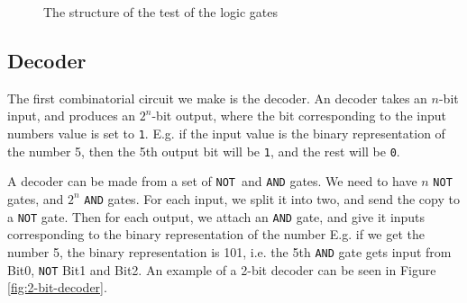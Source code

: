 \begin{figure}
    \centering
    \caption{The structure of the test of the logic gates}
    \label{fig:logic-test}
\end{figure}

\subsection{Decoder}
The first combinatorial circuit we make is the decoder. An decoder takes an
$n$-bit input, and produces an $2^n$-bit output, where the bit corresponding to
the input numbers value is set to \texttt{1}. E.g. if the input value is the
binary representation of the number 5, then the 5th output bit will be
\texttt{1}, and the rest will be \texttt{0}.

A decoder can be made from a set of \texttt{NOT} and \texttt{AND} gates. We
need to have $n$ \texttt{NOT} gates, and $2^n$ \texttt{AND} gates. For each
input, we split it into two, and send the copy to a \texttt{NOT} gate. Then for
each output, we attach an \texttt{AND} gate, and give it inputs corresponding
to the binary representation of the number %
E.g. if we get the number 5, the binary representation is 101, i.e. the 5th
\texttt{AND} gate gets input from Bit0, \texttt{NOT} Bit1 and Bit2. An example
of a 2-bit decoder can be seen in Figure \ref{fig:2-bit-decoder}.

